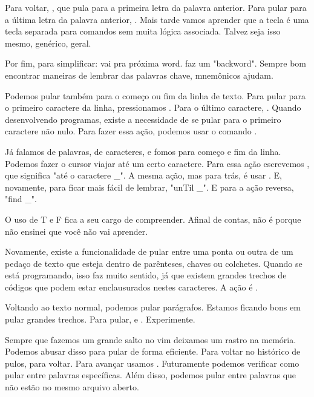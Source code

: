 \documentclass[a4paper, 12pt]{article}
\begin{document}
Para voltar, , que pula para a primeira letra da palavra anterior.
Para pular para a última letra da palavra anterior, .
Mais tarde vamos aprender que a tecla  é uma tecla separada para comandos sem muita lógica associada.
Talvez seja isso mesmo, genérico, geral.

Por fim, para simplificar:  vai pra próxima word.  faz um "backword".
Sempre bom encontrar maneiras de lembrar das palavras chave, mnemônicos ajudam.


Podemos pular também para o começo ou fim da linha de texto.
Para pular para o primeiro caractere da linha, pressionamos .
Para o último caractere, \vimcommand{\$}.
Quando desenvolvendo programas, existe a necessidade de se pular para o primeiro caractere não nulo.
Para fazer essa ação, podemos usar o comando \vimcommand{\^}.

Já falamos de palavras, de caracteres, e fomos para começo e fim da linha.
Podemos fazer o cursor viajar até um certo caractere.
Para essa ação escrevemos , que significa "até o caractere \_".
A mesma ação, mas para trás, é usar .
E, novamente, para ficar mais fácil de lembrar, "unTil \_".
E para a ação reversa, "find \_".

O uso de T e F fica a seu cargo de compreender.
Afinal de contas, não é porque não ensinei que você não vai aprender.


Novamente, existe a funcionalidade de pular entre uma ponta ou outra de um pedaço de
texto que esteja dentro de parênteses, chaves ou colchetes.
Quando se está programando, isso faz muito sentido, já que existem grandes trechos de
códigos que podem estar enclausurados nestes caracteres.
A ação é \vimcommand{\%}.


Voltando ao texto normal, podemos pular parágrafos.
Estamos ficando bons em pular grandes trechos.
Para pular, \vimcommand{\{} e \vimcommand{\}}. Experimente.


Sempre que fazemos um grande salto no vim deixamos um rastro na memória.
Podemos abusar disso para pular de forma eficiente.
Para voltar no histórico de pulos,  para voltar.
Para avançar usamos .
Futuramente podemos verificar como pular entre palavras específicas.
Além disso, podemos pular entre palavras que não estão no mesmo arquivo aberto.
\end{document}
